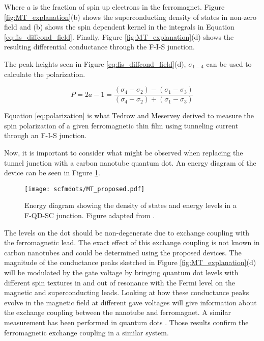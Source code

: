 Where $a$ is the fraction of spin up electrons in the ferromagnet. Figure \ref{fig:MT_explanation}(b) shows the superconducting density of states in non-zero field and (b) shows the spin dependent kernel in the integrals in Equation \ref{eq:fis_diffcond_field}. Finally, Figure \ref{fig:MT_explanation}(d) shows the resulting differential conductance through the F-I-S junction. 

The peak heights seen in Figure \ref{eq:fis_diffcond_field}(d), $\sigma_{1-4}$ can be used to calculate the polarization.

\begin{equation}
    \label{eq:polarization}
    P = 2a-1 = \frac{(\sigma_4 - \sigma_2) - (\sigma_1 - \sigma_3)}{(\sigma_4 - \sigma_2) + (\sigma_1 - \sigma_3)}
\end{equation}

Equation \ref{eq:polarization} is what Tedrow and Meservey derived to measure the spin polarization of a given ferromagnetic thin film using tunneling current through an F-I-S junction.

Now, it is important to consider what might be observed when replacing the tunnel junction with a carbon nanotube quantum dot. An energy diagram of the device can be seen in Figure \ref{fig:MT_proposed}.

\begin{figure}
    \centering
    \texttt{[image: scfmdots/MT\_proposed.pdf]}
    \caption{Energy diagram showing the density of states and energy levels in a F-QD-SC junction. Figure adapted from \cite{Moodera2010}.}
    \label{fig:MT_proposed}
\end{figure}

The levels on the dot should be non-degenerate due to exchange coupling with the ferromagnetic lead. The exact effect of this exchange coupling is not known in carbon nanotubes and could be determined using the proposed devices. The magnitude of the conductance peaks sketched in Figure \ref{fig:MT_explanation}(d) will be modulated by the gate voltage by bringing quantum dot levels with different spin textures in and out of resonance with the Fermi level on the magnetic and superconducting leads. Looking at how these conductance peaks evolve in the magnetic field at different gave voltages will give information about the exchange coupling between the nanotube and ferromagnet. A similar measurement has been performed in  quantum dots \cite{Hofstetter2010}. Those results confirm the ferromagnetic exchange coupling in a similar system.

